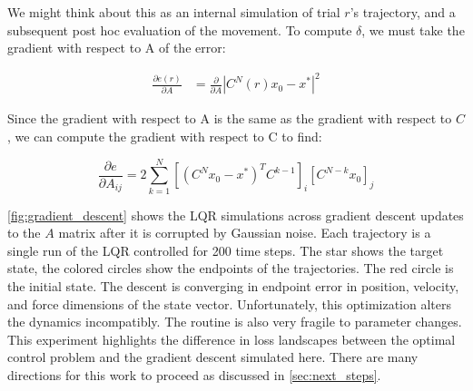 \documentclass[
  a4paper,
]{article}
\begin{document}
We might think about this as an internal simulation of trial \(r\)'s
trajectory, and a subsequent post hoc evaluation of the movement. To
compute \(\delta\), we must take the gradient with respect to A of the
error:

\[
\begin{aligned}
\frac{\partial{e(r)}}{\partial{A}} &= \frac{\partial{}}{\partial{A}}{|C^N(r)x_0 - x^*|^2}
\end{aligned}
\]

Since the gradient with respect to A is the same as the gradient with
respect to \(C\), we can compute the gradient with respect to C to find:

\[
\frac{\partial{e}}{\partial{A_{ij}}} = 2\sum_{k=1}^N\left[(C^Nx_0 - x^*)^TC^{k-1}\right]_i\left[C^{N-k}x_0\right]_j
\]

\cref{fig:gradient_descent} shows the LQR simulations across gradient
descent updates to the \(A\) matrix after it is corrupted by Gaussian
noise. Each trajectory is a single run of the LQR controlled for 200
time steps. The star shows the target state, the colored circles show
the endpoints of the trajectories. The red circle is the initial state.
The descent is converging in endpoint error in position, velocity, and
force dimensions of the state vector. Unfortunately, this optimization
alters the dynamics incompatibly. The routine is also very fragile to
parameter changes. This experiment highlights the difference in loss
landscapes between the optimal control problem and the gradient descent
simulated here. There are many directions for this work to proceed as
discussed in \cref{sec:next_steps}.
\end{document}
